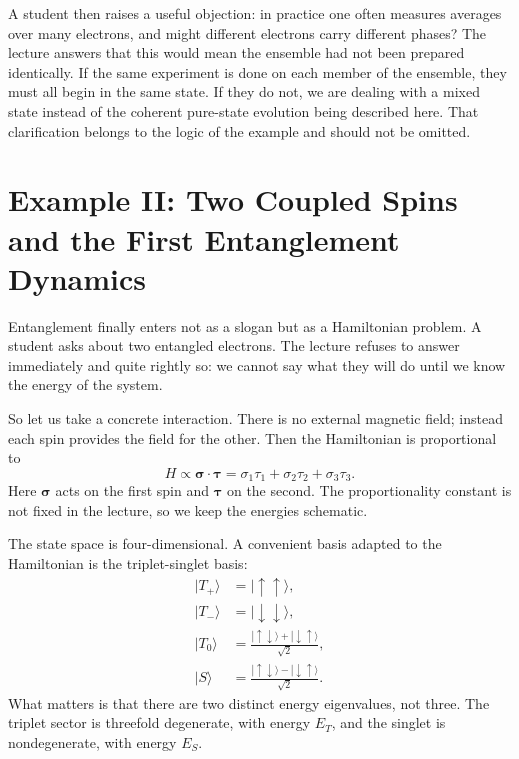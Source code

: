 A student then raises a useful objection: in practice one often measures averages over many electrons, and might different electrons carry different phases? The lecture answers that this would mean the ensemble had not been prepared identically. If the same experiment is done on each member of the ensemble, they must all begin in the same state. If they do not, we are dealing with a mixed state instead of the coherent pure-state evolution being described here. That clarification belongs to the logic of the example and should not be omitted.

\section{Example II: Two Coupled Spins and the First Entanglement Dynamics}

Entanglement finally enters not as a slogan but as a Hamiltonian problem. A student asks about two entangled electrons. The lecture refuses to answer immediately and quite rightly so: we cannot say what they will do until we know the energy of the system.

So let us take a concrete interaction. There is no external magnetic field; instead each spin provides the field for the other. Then the Hamiltonian is proportional to
\begin{equation}
H\propto \boldsymbol{\sigma}\cdot\boldsymbol{\tau}
=
\sigma_1\tau_1+\sigma_2\tau_2+\sigma_3\tau_3.
\end{equation}
Here \(\boldsymbol{\sigma}\) acts on the first spin and \(\boldsymbol{\tau}\) on the second. The proportionality constant is not fixed in the lecture, so we keep the energies schematic.

The state space is four-dimensional. A convenient basis adapted to the Hamiltonian is the triplet-singlet basis:
\begin{align}
|T_+\rangle &= |\uparrow\uparrow\rangle, \\
|T_-\rangle &= |\downarrow\downarrow\rangle, \\
|T_0\rangle &= \frac{|\uparrow\downarrow\rangle+|\downarrow\uparrow\rangle}{\sqrt2}, \\
|S\rangle &= \frac{|\uparrow\downarrow\rangle-|\downarrow\uparrow\rangle}{\sqrt2}.
\end{align}
What matters is that there are two distinct energy eigenvalues, not three. The triplet sector is threefold degenerate, with energy \(E_T\), and the singlet is nondegenerate, with energy \(E_S\).

